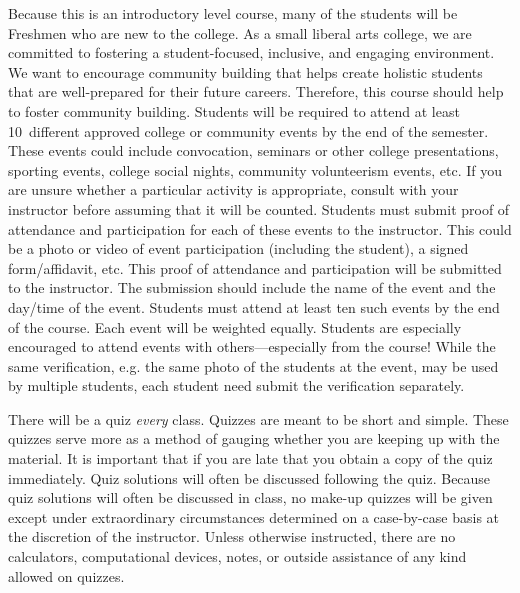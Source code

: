 \documentclass[11pt,letterpaper]{article}
\begin{document}
 Because this is an introductory level course, many of the students will be Freshmen who are new to the college. As a small liberal arts college, we are committed to fostering a student-focused, inclusive, and engaging environment. We want to encourage community building that helps create holistic students that are well-prepared for their future careers. Therefore, this course should help to foster community building. Students will be required to attend at least 10~different approved college or community events by the end of the semester. These events could include convocation, seminars or other college presentations, sporting events, college social nights, community volunteerism events, etc. If you are unsure whether a particular activity is appropriate, consult with your instructor before assuming that it will be counted. Students must submit proof of attendance and participation for each of these events to the instructor. This could be a photo or video of event participation (including the student), a signed form/affidavit, etc. This proof of attendance and participation will be submitted to the instructor. The submission should include the name of the event and the day/time of the event. Students must attend at least ten such events by the end of the course. Each event will be weighted equally. Students are especially encouraged to attend events with others---especially from the course! While the same verification, e.g. the same photo of the students at the event, may be used by multiple students, each student need submit the verification separately. \pspace



There will be a quiz \textit{every} class. Quizzes are meant to be short and simple. These quizzes serve more as a method of gauging whether you are keeping up with the material. It is important that if you are late that you obtain a copy of the quiz immediately. Quiz solutions will often be discussed following the quiz. Because quiz solutions will often be discussed in class, no make-up quizzes will be given except under extraordinary circumstances determined on a case-by-case basis at the discretion of the instructor. Unless otherwise instructed, there are no calculators, computational devices, notes, or outside assistance of any kind allowed on quizzes. \pspace





\newpage
\end{document}
